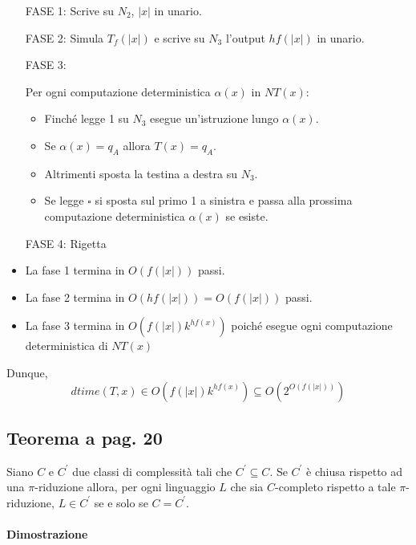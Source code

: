 \begin{itemize}
    \item [FASE 1:] Scrive su $N_{2}$, $|x|$ in unario.
    \item [FASE 2:] {
        Simula $T_{f}(|x|)$ e scrive su $N_{3}$ l'output $hf(|x|)$ in unario.
    }
    \item [FASE 3:] {
        Per ogni computazione deterministica $\alpha(x)$ in $NT(x)$:
        \begin{itemize}
            \item Finché legge 1 su $N_{3}$ esegue un'istruzione lungo $\alpha(x)$.
            \item Se $\alpha(x) = q_{A}$ allora $T(x) = q_{A}$.
            \item Altrimenti sposta la testina a destra su $N_{3}$.
            \item Se legge $\square$ si sposta sul primo 1 a sinistra e passa alla prossima computazione deterministica $\alpha(x)$ se esiste.
        \end{itemize}
    }
    \item [FASE 4:] Rigetta
\end{itemize}

\begin{itemize}
    \item La fase 1 termina in $O(f(|x|))$ passi.
    \item La fase 2 termina in $O(hf(|x|)) = O(f(|x|))$ passi.
    \item La fase 3 termina in $O(f(|x|)k^{hf(x)})$ poiché esegue ogni computazione deterministica di $NT(x)$
\end{itemize}

Dunque, $$dtime(T, x) \in O(f(|x|)k^{hf(x)}) \subseteq{O(2^{O(f(|x|))})}$$

\subsection{Teorema a pag. 20}

Siano $C$ e $C^{'}$ due classi di complessità tali che $C^{'} \subseteq C$. Se $C^{'}$ è chiusa rispetto ad una $\pi$-riduzione
allora, per ogni linguaggio $L$ che sia $C$-completo rispetto a tale $\pi$-riduzione, $L \in C^{'}$ se e solo se $C = C^{'}$.

\paragraph*{Dimostrazione}

